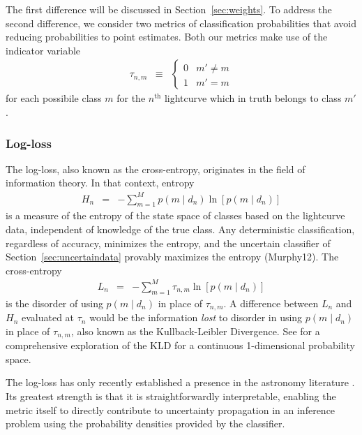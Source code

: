 The first difference will be discussed in Section~\ref{sec:weights}.
To address the second difference, we consider two metrics of classification probabilities that avoid reducing probabilities to point estimates.
Both our metrics make use of the indicator variable
\begin{eqnarray}
  \label{eq:indicator}
  \tau_{n, m} &\equiv& \begin{cases}
  0 & m' \neq m\\
  1 & m' = m
  \end{cases}
\end{eqnarray}
for each possibile class $m$ for the $n^{\mathrm{th}}$ lightcurve which in truth belongs to class $m'$.

\subsubsection{Log-loss}
\label{sec:logloss}

The log-loss, also known as the cross-entropy, originates in the field of information theory.
In that context, entropy
\begin{eqnarray}
  \label{eq:entropy}
  H_{n} &=& -\sum_{m=1}^{M}p(m \mid d_{n})\ln[p(m \mid d_{n})]
\end{eqnarray}
is a measure of the entropy of the state space of classes based on the lightcurve data, independent of knowledge of the true class.
Any deterministic classification, regardless of accuracy, minimizes the entropy, and the uncertain classifier of Section~\ref{sec:uncertaindata} provably maximizes the entropy (Murphy12).
The cross-entropy
\begin{eqnarray}
  \label{eq:logloss}
  L_{n} &=& -\sum_{m=1}^{M}\tau_{n, m}\ln[p(m \mid d_{n})]
\end{eqnarray}
is the disorder of using $p(m \mid d_{n})$ in place of $\tau_{n, m}$.
A difference between $L_{n}$ and $H_{n}$ evaluated at $\tau_{n}$ would be the information \textit{lost} to disorder in using $p(m \mid d_{n})$ in place of $\tau_{n, m}$, also known as the Kullback-Leibler Divergence.
See \cite{2018AJ....156...35M} for a comprehensive exploration of the KLD for a continuous 1-dimensional probability space.

The log-loss has only recently established a presence in the astronomy literature \citep{hon_deep_2017, hon_deep_2018}.
Its greatest strength is that it is straightforwardly interpretable, enabling the metric itself to directly contribute to uncertainty propagation in an inference problem using the probability densities provided by the classifier.

